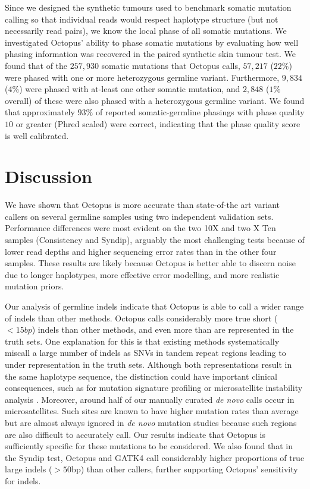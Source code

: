 \documentclass[notitlepage, twocolumn, 10pt]{article}
\begin{document}
Since we designed the synthetic tumours used to benchmark somatic mutation calling so that individual reads would respect haplotype structure (but not necessarily read pairs), we know the local phase of all somatic mutations. We investigated Octopus' ability to phase somatic mutations by evaluating how well phasing information was recovered in the paired synthetic skin tumour test. We found that of the $257,930$ somatic mutations that Octopus calls, $57,217$ ($22\%$) were phased with one or more heterozygous germline variant. Furthermore, $9,834$ ($4\%$) were phased with at-least one other somatic mutation, and $2,848$ ($1\%$ overall) of these were also phased with a heterozygous germline variant. We found that approximately $93\%$ of reported somatic-germline phasings with phase quality $10$ or greater (Phred scaled) were correct, indicating that the phase quality score is well calibrated.

\section*{Discussion}

We have shown that Octopus is more accurate than state-of-the art variant callers on several germline samples using two independent validation sets. Performance differences were most evident on the two 10X and two X Ten samples (Consistency and Syndip), arguably the most challenging tests because of lower read depths and higher sequencing error rates than in the other four samples. These results are likely because Octopus is better able to discern noise due to longer haplotypes, more effective error modelling, and more realistic mutation priors.

Our analysis of germline indels indicate that Octopus is able to call a wider range of indels than other methods. Octopus calls considerably more true short ($<15bp$) indels than other methods, and even more than are represented in the truth sets. One explanation for this is that existing methods systematically miscall a large number of indels as SNVs in tandem repeat regions leading to under representation in the truth sets. Although both representations result in the same haplotype sequence, the distinction could have important clinical consequences, such as for mutation signature profiling \cite{RN86} or microsatellite instability analysis \cite{RN331, RN454}. Moreover, around half of our manually curated \textit{de novo} calls occur in microsatellites. Such sites are known to have higher mutation rates than average but are almost always ignored in \textit{de novo} mutation studies because such regions are also difficult to accurately call. Our results indicate that Octopus is sufficiently specific for these mutations to be considered.
We also found that in the Syndip test, Octopus and GATK4 call considerably higher proportions of true large indels ($>50$bp) than other callers, further supporting Octopus' sensitivity for indels.
\end{document}
